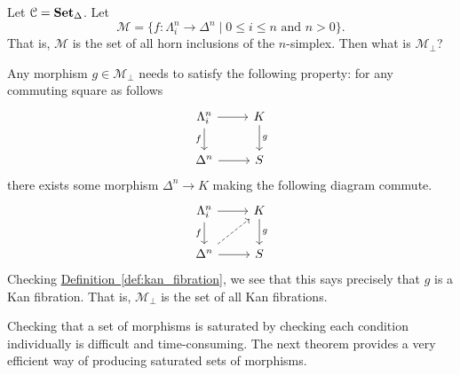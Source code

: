 \documentclass[main.tex]{subfiles}
\begin{document}
\begin{example}
  \label{eg:kan_fibrations_are_have_rlp_wrt_horn_fillings}
  Let $\mathcal{C} = \operatorname{\mathbf{Set}_{\Delta}}$. Let
  \begin{equation*}
    \mathcal{M} = \{f\colon \Lambda^{n}_{i} \to \Delta^{n} \mid 0 \leq i \leq n \text{ and } n > 0\}.
  \end{equation*}
  That is, $\mathcal{M}$ is the set of all horn inclusions of the $n$-simplex. Then what is $\mathcal{M}_{\perp}$?

  Any morphism $g \in \mathcal{M}_{\perp}$ needs to satisfy the following property: for any commuting square as follows
  \begin{equation*}
    \begin{tikzcd}
      \Lambda^{n}_{i}
      \arrow[r]
      \arrow[d, swap, "f"]
      & K
      \arrow[d, "g"]
      \\
      \Delta^{n}
      \arrow[r]
      & S
    \end{tikzcd}
  \end{equation*}
  there exists some morphism $\Delta^{n} \to K$ making the following diagram commute.
  \begin{equation*}
    \begin{tikzcd}
      \Lambda^{n}_{i}
      \arrow[r]
      \arrow[d, swap, "f"]
      & K
      \arrow[d, "g"]
      \\
      \Delta^{n}
      \arrow[ur, dashed]
      \arrow[r]
      & S
    \end{tikzcd}
  \end{equation*}
  Checking \hyperref[def:kan_fibration]{Definition~\ref*{def:kan_fibration}}, we see that this says precisely that $g$ is a Kan fibration. That is, $\mathcal{M}_{\perp}$ is the set of all Kan fibrations.
\end{example}

Checking that a set of morphisms is saturated by checking each condition individually is difficult and time-consuming. The next theorem provides a very efficient way of producing saturated sets of morphisms.
\end{document}
